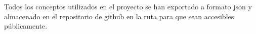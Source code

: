 \begin{enumerate}
    Todos los conceptos utilizados en el proyecto se han exportado a formato json y almacenado en el repositorio de github en la ruta  para que sean accesibles públicamente.
    
\end{enumerate}